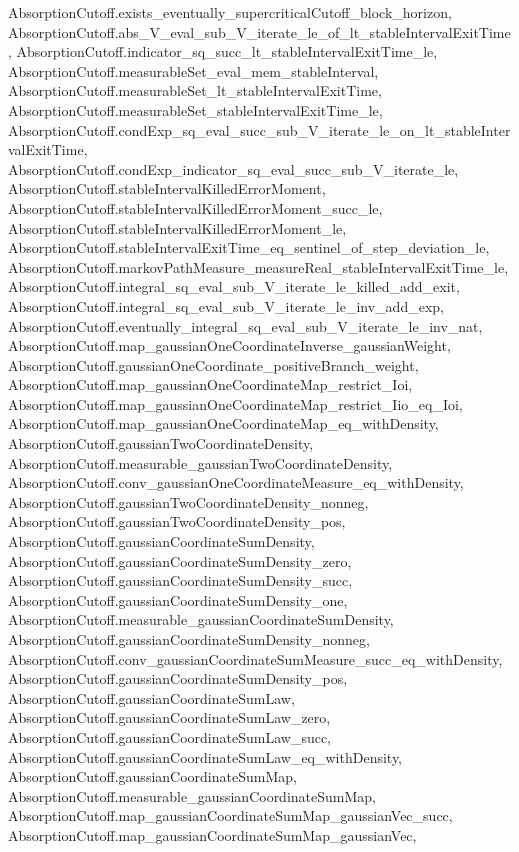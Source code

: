 \begin{lemma}
{    AbsorptionCutoff.exists_eventually_supercriticalCutoff_block_horizon,
    AbsorptionCutoff.abs_V_eval_sub_V_iterate_le_of_lt_stableIntervalExitTime,
    AbsorptionCutoff.indicator_sq_succ_lt_stableIntervalExitTime_le,
    AbsorptionCutoff.measurableSet_eval_mem_stableInterval,
    AbsorptionCutoff.measurableSet_lt_stableIntervalExitTime,
    AbsorptionCutoff.measurableSet_stableIntervalExitTime_le,
    AbsorptionCutoff.condExp_sq_eval_succ_sub_V_iterate_le_on_lt_stableIntervalExitTime,
    AbsorptionCutoff.condExp_indicator_sq_eval_succ_sub_V_iterate_le,
    AbsorptionCutoff.stableIntervalKilledErrorMoment,
    AbsorptionCutoff.stableIntervalKilledErrorMoment_succ_le,
    AbsorptionCutoff.stableIntervalKilledErrorMoment_le,
    AbsorptionCutoff.stableIntervalExitTime_eq_sentinel_of_step_deviation_le,
    AbsorptionCutoff.markovPathMeasure_measureReal_stableIntervalExitTime_le,
    AbsorptionCutoff.integral_sq_eval_sub_V_iterate_le_killed_add_exit,
    AbsorptionCutoff.integral_sq_eval_sub_V_iterate_le_inv_add_exp,
    AbsorptionCutoff.eventually_integral_sq_eval_sub_V_iterate_le_inv_nat,
    AbsorptionCutoff.map_gaussianOneCoordinateInverse_gaussianWeight,
    AbsorptionCutoff.gaussianOneCoordinate_positiveBranch_weight,
    AbsorptionCutoff.map_gaussianOneCoordinateMap_restrict_Ioi,
    AbsorptionCutoff.map_gaussianOneCoordinateMap_restrict_Iio_eq_Ioi,
    AbsorptionCutoff.map_gaussianOneCoordinateMap_eq_withDensity,
    AbsorptionCutoff.gaussianTwoCoordinateDensity,
    AbsorptionCutoff.measurable_gaussianTwoCoordinateDensity,
    AbsorptionCutoff.conv_gaussianOneCoordinateMeasure_eq_withDensity,
    AbsorptionCutoff.gaussianTwoCoordinateDensity_nonneg,
    AbsorptionCutoff.gaussianTwoCoordinateDensity_pos,
    AbsorptionCutoff.gaussianCoordinateSumDensity,
    AbsorptionCutoff.gaussianCoordinateSumDensity_zero,
    AbsorptionCutoff.gaussianCoordinateSumDensity_succ,
    AbsorptionCutoff.gaussianCoordinateSumDensity_one,
    AbsorptionCutoff.measurable_gaussianCoordinateSumDensity,
    AbsorptionCutoff.gaussianCoordinateSumDensity_nonneg,
    AbsorptionCutoff.conv_gaussianCoordinateSumMeasure_succ_eq_withDensity,
    AbsorptionCutoff.gaussianCoordinateSumDensity_pos,
    AbsorptionCutoff.gaussianCoordinateSumLaw,
    AbsorptionCutoff.gaussianCoordinateSumLaw_zero,
    AbsorptionCutoff.gaussianCoordinateSumLaw_succ,
    AbsorptionCutoff.gaussianCoordinateSumLaw_eq_withDensity,
    AbsorptionCutoff.gaussianCoordinateSumMap,
    AbsorptionCutoff.measurable_gaussianCoordinateSumMap,
    AbsorptionCutoff.map_gaussianCoordinateSumMap_gaussianVec_succ,
    AbsorptionCutoff.map_gaussianCoordinateSumMap_gaussianVec,
}
\end{lemma}
